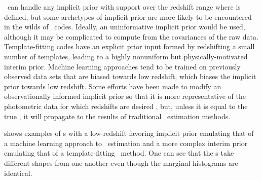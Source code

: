 \Chippr\ can handle any implicit prior with support over the redshift range where \nz is defined, but some archetypes of implicit prior are more likely to be encountered in the wilds of \pzpdf\ codes.
Ideally, an uninformative implicit prior would be used, although it may be complicated to compute from the covariances of the raw data.  
Template-fitting codes have an explicit prior input formed by redshifting a small number of templates, leading to a highly nonuniform but physically-motivated interim prior.
Machine learning approaches tend to be trained on previously observed data sets that are biased towards low redshift, which biases the implicit prior towards low redshift.
Some efforts have been made to modify an observationally informed implicit prior so that it is more representative of the photometric data for which redshifts are desired \citep{Sheldon2012}, but, unless it is equal to the true \nz, it will propagate to the results of traditional \nz\ estimation methods.  

 shows examples of \pzpdf s with a low-redshift favoring implicit prior emulating that of a machine learning approach to \pz\ estimation and a more complex interim prior emulating that of a template-fitting \pz\ method.
One can see that the \pzpdf s take different shapes from one another even though the marginal histograms are identical.

